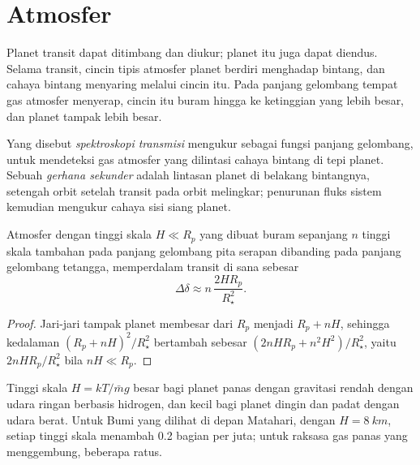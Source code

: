 \section{Atmosfer}\label{sec:b3:exoplanets:atmospheres}

Planet transit dapat ditimbang dan diukur; planet itu juga dapat diendus.
Selama transit, cincin tipis atmosfer planet berdiri menghadap
bintang, dan cahaya bintang menyaring melalui cincin itu. Pada panjang gelombang tempat gas
atmosfer menyerap, cincin itu buram hingga ke ketinggian yang lebih besar, dan planet
tampak lebih besar.

\begin{definition}\label{def:b3:exoplanets:transmission}
Yang disebut \emph{spektroskopi transmisi} mengukur
 sebagai fungsi panjang gelombang, untuk mendeteksi gas
atmosfer yang dilintasi cahaya bintang di tepi planet. Sebuah
\emph{gerhana sekunder} adalah lintasan
planet di belakang bintangnya, setengah orbit setelah transit pada orbit
melingkar; penurunan fluks sistem kemudian mengukur cahaya
sisi siang planet.
\end{definition}

\begin{proposition}\label{prop:b3:exoplanets:transmission}
Atmosfer dengan tinggi skala $H \ll R_p$ yang dibuat buram sepanjang $n$ tinggi
skala tambahan pada panjang gelombang pita serapan dibanding pada
panjang gelombang tetangga, memperdalam transit di sana sebesar
\[
\Delta\delta \approx n\,\frac{2HR_p}{R_\star^2} .
\]
\end{proposition}

\begin{proof}
Jari-jari tampak planet membesar dari $R_p$ menjadi $R_p + nH$, sehingga
kedalaman $(R_p + nH)^2/R_\star^2$ bertambah sebesar $(2nHR_p + n^2H^2)/R_\star^2$,
yaitu $2nHR_p/R_\star^2$ bila $nH \ll R_p$.
\end{proof}

Tinggi skala $H = kT/\bar m g$ besar bagi planet panas dengan gravitasi rendah
dengan udara ringan berbasis hidrogen, dan kecil bagi planet dingin dan padat dengan
udara berat. Untuk Bumi yang dilihat di depan Matahari, dengan $H = \qty{8}{km}$,
setiap tinggi skala menambah 0.2 bagian per juta; untuk raksasa gas panas yang menggembung,
beberapa ratus.

